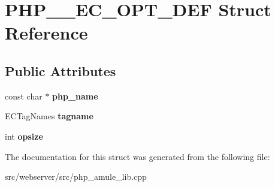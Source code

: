 \section{PHP\_\_\-EC\_\-OPT\_\-DEF Struct Reference}
\label{structPHP__2__EC__OPT__DEF}
\subsection*{Public Attributes}
\begin{DoxyCompactItemize}
\item 
const char $\ast$ {\bfseries php\_\-name}\label{structPHP__2__EC__OPT__DEF_af4e39ece3ea476e4dc2abd27e87d2f80}

\item 
ECTagNames {\bfseries tagname}\label{structPHP__2__EC__OPT__DEF_a185b961eb241228aae1ac8f0345f1573}

\item 
int {\bfseries opsize}\label{structPHP__2__EC__OPT__DEF_a1d1b7cd9e41c2c2a14af2895f749383a}

\end{DoxyCompactItemize}


The documentation for this struct was generated from the following file:\begin{DoxyCompactItemize}
\item 
src/webserver/src/php\_\-amule\_\-lib.cpp\end{DoxyCompactItemize}
